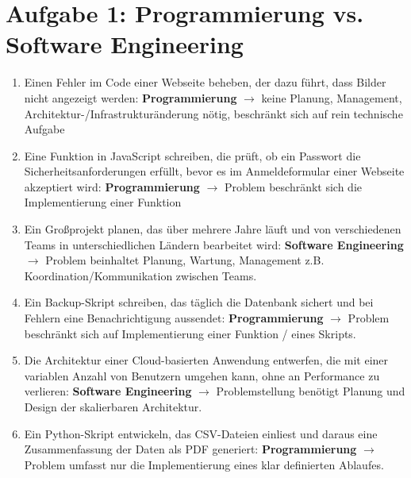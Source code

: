 \section*{Aufgabe 1: Programmierung vs. Software Engineering}

\begin{enumerate}
\item Einen Fehler im Code einer Webseite beheben, der dazu führt, dass Bilder nicht angezeigt werden:
\newline \textbf{Programmierung} $\rightarrow$ keine Planung, Management, Architektur-/Infrastrukturänderung nötig, beschränkt sich auf rein technische Aufgabe

\item Eine Funktion in JavaScript schreiben, die prüft, ob ein Passwort
die Sicherheitsanforderungen erfüllt, bevor es im
Anmeldeformular einer Webseite akzeptiert wird:
\newline \textbf{Programmierung} $\rightarrow$ Problem beschränkt sich die Implementierung einer Funktion

\item Ein Großprojekt planen, das über mehrere Jahre läuft und von
verschiedenen Teams in unterschiedlichen Ländern bearbeitet
wird:
\newline \textbf{Software Engineering} $\rightarrow$ Problem beinhaltet Planung, Wartung, Management z.B. Koordination/Kommunikation zwischen Teams.

\item Ein Backup-Skript schreiben, das täglich die Datenbank sichert
und bei Fehlern eine Benachrichtigung aussendet:
\newline \textbf{Programmierung} $\rightarrow$ Problem beschränkt sich auf Implementierung einer Funktion / eines Skripts.

\item Die Architektur einer Cloud-basierten Anwendung entwerfen, die
mit einer variablen Anzahl von Benutzern umgehen kann, ohne
an Performance zu verlieren:
\newline \textbf{Software Engineering} $\rightarrow$ Problemstellung benötigt Planung und Design der skalierbaren Architektur.

\item Ein Python-Skript entwickeln, das CSV-Dateien einliest und
daraus eine Zusammenfassung der Daten als PDF generiert:
\newline \textbf{Programmierung} $\rightarrow$ Problem umfasst nur die Implementierung eines klar definierten Ablaufes.


\end{enumerate}
